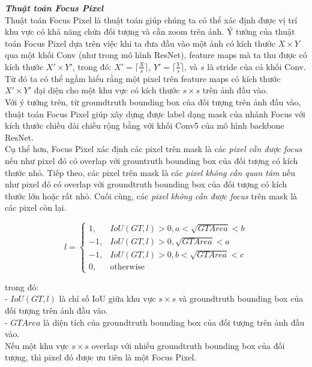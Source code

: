 {    \noindent
    \textbf{\textit{Thuật toán Focus Pixel}} \\
    Thuật toán Focus Pixel là thuật toán giúp chúng ta có thể xác định được vị trí khu vực có khả năng chứa đối tượng và cần zoom trên ảnh.
    Ý tưởng của thuật toán Focus Pixel dựa trên việc khi ta đưa đầu vào một ảnh có kích thước $X \times Y$ qua một khối Conv (như trong mô hình ResNet), feature maps mà ta thu được có kích thước $X' \times Y'$, trong đó: $X' = \lceil \frac{X}{s} \rceil$, $Y' = \lceil \frac{Y}{s} \rceil$, và $s$ là stride của cả khối Conv.
    Từ đó ta có thể ngầm hiểu rằng một pixel trên feature maps có kích thước $X' \times Y'$ đại diện cho một khu vực có kích thước $s \times s$ trên ảnh đầu vào. \\
    Với ý tưởng trên, từ groundtruth bounding box của đối tượng trên ảnh đầu vào, thuật toán Focus Pixel giúp xây dựng được label dạng mask của nhánh Focus với kích thước chiều dài chiều rộng bằng với khối Conv5 của mô hình backbone ResNet. \\
    Cụ thể hơn, Focus Pixel xác định các pixel trên mask là các \textit{pixel cần được focus} nếu như pixel đó có overlap với grountruth bounding box của đối tượng có kích thước nhỏ.
    Tiếp theo, các pixel trên mask là các \textit{pixel không cần quan tâm} nếu như pixel đó có overlap với groundtruth bounding box của đối tượng có kích thước lớn hoặc rất nhỏ.
    Cuối cùng, các \textit{pixel không cần được focus} trên mask là các pixel còn lại.

    \[l = 
        \begin{cases}
            1, & IoU(GT, l) > 0, a < \sqrt{GTArea} < b \\
            -1, & IoU(GT, l) > 0, \sqrt{GTArea} < a  \\
            -1, & IoU(GT, l) > 0, b < \sqrt{GTArea} < c  \\
            0, & \text{otherwise}
        \end{cases}
    \]

    \noindent
    trong đó: \\
    - $IoU(GT, l)$ là chỉ số IoU giữa khu vực $s \times s$ và groundtruth bounding box của đối tượng trên ảnh đầu vào. \\
    - $GTArea$ là diện tích của groundtruth bounding box của đối tượng trên ảnh đầu vào. \\
    Nếu một khu vực $s \times s$ overlap với nhiều groundtruth bounding box của đối tượng, thì pixel đó được ưu tiên là một Focus Pixel.

}
